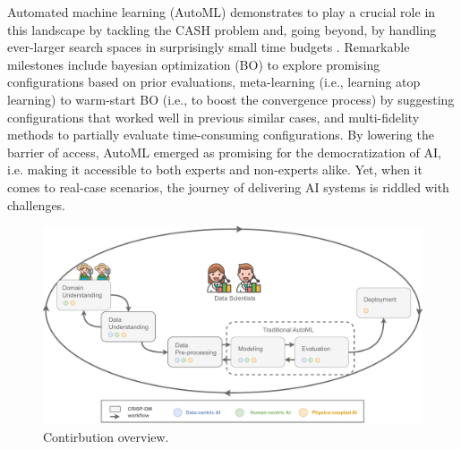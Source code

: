 Automated machine learning (AutoML) demonstrates to play a crucial role in this landscape by tackling the CASH problem and, going beyond, by handling ever-larger search spaces in surprisingly small time budgets \cite{thornton2013auto, olson2016tpot, auto_sklearn}.
Remarkable milestones include bayesian optimization (BO) to explore promising configurations based on prior evaluations,
meta-learning (i.e., learning atop learning) to warm-start BO (i.e., to boost the convergence process) by suggesting configurations that worked well in previous similar cases, and multi-fidelity methods to partially evaluate time-consuming configurations.
By lowering the barrier of access, AutoML emerged as promising for the democratization of AI, i.e. making it accessible to both experts and non-experts alike.
Yet, when it comes to real-case scenarios, the journey of
delivering AI systems is riddled with challenges.

\begin{figure}
    \centering
    \includegraphics[width=1\textwidth]{chapters/introduction/img/contribution_overview.pdf}
    \caption{Contirbution overview.}
    \label{fig:contribution}
\end{figure}

